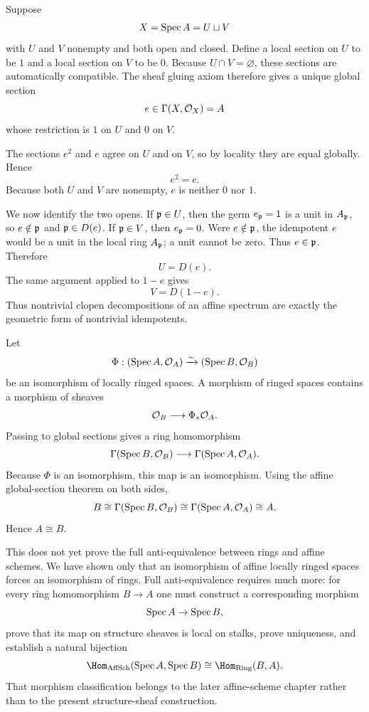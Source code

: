 \begin{solution}[Challenge VI.17.C4]
Suppose
\[
X=\operatorname{Spec} A=U\sqcup V
\]
with $U$ and $V$ nonempty and both open and closed.  Define a local section on $U$ to be $1$ and a local section on $V$ to be $0$.  Because $U\cap V=\varnothing$, these sections are automatically compatible.  The sheaf gluing axiom therefore gives a unique global section
\[
e\in\Gamma(X,\mathcal O_X)=A
\]
whose restriction is $1$ on $U$ and $0$ on $V$.

The sections $e^2$ and $e$ agree on $U$ and on $V$, so by locality they are equal globally.  Hence
\[
e^2=e.
\]
Because both $U$ and $V$ are nonempty, $e$ is neither $0$ nor $1$.

We now identify the two opens.  If $\mathfrak p\in U$, then the germ $e_{\mathfrak p}=1$ is a unit in $A_{\mathfrak p}$, so $e\notin\mathfrak p$ and $\mathfrak p\in D(e)$.  If $\mathfrak p\in V$, then $e_{\mathfrak p}=0$.  Were $e\notin\mathfrak p$, the idempotent $e$ would be a unit in the local ring $A_{\mathfrak p}$; a unit cannot be zero.  Thus $e\in\mathfrak p$.  Therefore
\[
U=D(e).
\]
The same argument applied to $1-e$ gives
\[
V=D(1-e).
\]
Thus nontrivial clopen decompositions of an affine spectrum are exactly the geometric form of nontrivial idempotents.
\end{solution}

\begin{solution}[Challenge VI.17.C5]
Let
\[
\Phi:(\operatorname{Spec} A,\mathcal O_A)\xrightarrow{\sim}(\operatorname{Spec} B,\mathcal O_B)
\]
be an isomorphism of locally ringed spaces.  A morphism of ringed spaces contains a morphism of sheaves
\[
\mathcal O_B\longrightarrow \Phi_*\mathcal O_A.
\]
Passing to global sections gives a ring homomorphism
\[
\Gamma(\operatorname{Spec} B,\mathcal O_B)
\longrightarrow
\Gamma(\operatorname{Spec} A,\mathcal O_A).
\]
Because $\Phi$ is an isomorphism, this map is an isomorphism.  Using the affine global-section theorem on both sides,
\[
B\cong\Gamma(\operatorname{Spec} B,\mathcal O_B)
\cong
\Gamma(\operatorname{Spec} A,\mathcal O_A)
\cong A.
\]
Hence $A\cong B$.

This does not yet prove the full anti-equivalence between rings and affine schemes.  We have shown only that an isomorphism of affine locally ringed spaces forces an isomorphism of rings.  Full anti-equivalence requires much more: for every ring homomorphism $B\to A$ one must construct a corresponding morphism
\[
\operatorname{Spec} A\to\operatorname{Spec} B,
\]
prove that its map on structure sheaves is local on stalks, prove uniqueness, and establish a natural bijection
\[
\Hom_{\mathrm{AffSch}}(\Spec A,\Spec B)
\cong
\Hom_{\mathrm{Ring}}(B,A).
\]
That morphism classification belongs to the later affine-scheme chapter rather than to the present structure-sheaf construction.
\end{solution}
